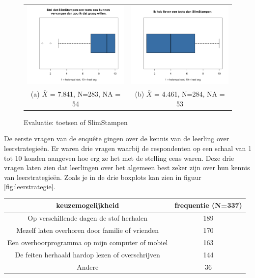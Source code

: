\documentclass[12pt, a4paper]{article}
\begin{document}
    \begin{figure}
        \begin{tabular}{cc}
          \includegraphics[width=65mm]{25-ToetsVervangen.png} &   \includegraphics[width=65mm]{26-LieverToets.png} \\
        (a)  $\overline{X}$ = 7.841, N=283, NA = 54 & (b) $\overline{X}$ =  4.461, N=284, NA = 53 \\[6pt]
        \end{tabular}
        \caption{Evaluatie: toetsen of SlimStampen}
        \label{fig:evaluatie}
        \end{figure}

De eerste vragen van de enquête gingen over de kennis van de leerling over leerstrategieën. Er waren drie vragen waarbij de respondenten op een schaal van 1 tot 10 konden aangeven hoe erg ze het met de stelling eens waren. Deze drie vragen laten zien dat leerlingen over het algemeen best zeker zijn over hun kennis van leerstrategieën. Zoals je in de drie boxplots kan zien in figuur \ref*{fig:leerstrategie}. 

\begin{center}
    \begin{tabular}{|c|c|} 
    \hline
         keuzemogelijkheid & frequentie (N=337) \\
     \hline
     Op verschillende dagen de stof herhalen & 189 \\ 
     Mezelf laten overhoren door familie of vrienden & 170  \\ 
     Een overhoorprogramma op mijn computer of mobiel & 163 \\
     De feiten herhaald hardop lezen of overschrijven & 144  \\ 
     Andere & 36 \\
     \hline
    \end{tabular}
    \end{center}
\end{document}
